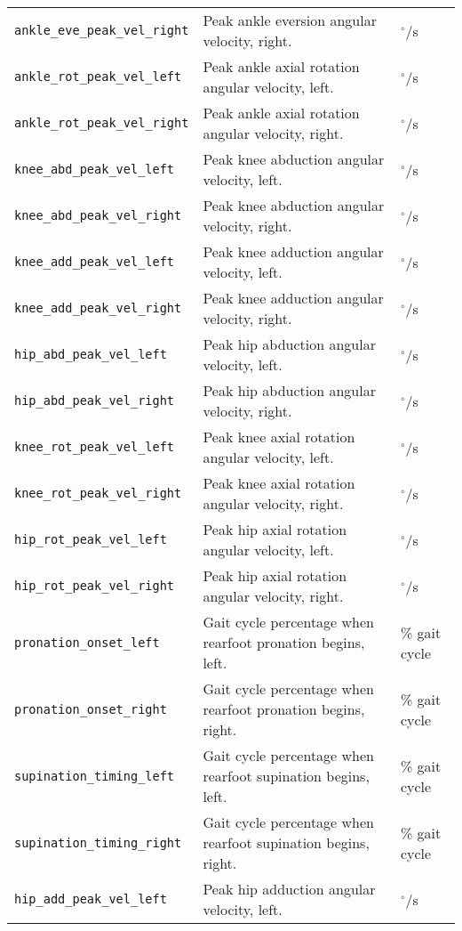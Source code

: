 \begin{longtable}{@{}l p{} l@{}}
    \texttt{ankle\_eve\_peak\_vel\_right} & Peak ankle eversion angular velocity, right. & $^\circ$/s \\
    \texttt{ankle\_rot\_peak\_vel\_left} & Peak ankle axial rotation angular velocity, left. & $^\circ$/s \\
    \texttt{ankle\_rot\_peak\_vel\_right} & Peak ankle axial rotation angular velocity, right. & $^\circ$/s \\
    \texttt{knee\_abd\_peak\_vel\_left} & Peak knee abduction angular velocity, left. & $^\circ$/s \\
    \texttt{knee\_abd\_peak\_vel\_right} & Peak knee abduction angular velocity, right. & $^\circ$/s \\
    \texttt{knee\_add\_peak\_vel\_left} & Peak knee adduction angular velocity, left. & $^\circ$/s \\
    \texttt{knee\_add\_peak\_vel\_right} & Peak knee adduction angular velocity, right. & $^\circ$/s \\
    \texttt{hip\_abd\_peak\_vel\_left} & Peak hip abduction angular velocity, left. & $^\circ$/s \\
    \texttt{hip\_abd\_peak\_vel\_right} & Peak hip abduction angular velocity, right. & $^\circ$/s \\
    \texttt{knee\_rot\_peak\_vel\_left} & Peak knee axial rotation angular velocity, left. & $^\circ$/s \\
    \texttt{knee\_rot\_peak\_vel\_right} & Peak knee axial rotation angular velocity, right. & $^\circ$/s \\
    \texttt{hip\_rot\_peak\_vel\_left} & Peak hip axial rotation angular velocity, left. & $^\circ$/s \\
    \texttt{hip\_rot\_peak\_vel\_right} & Peak hip axial rotation angular velocity, right. & $^\circ$/s \\
    \texttt{pronation\_onset\_left} & Gait cycle percentage when rearfoot pronation begins, left. & \% gait cycle \\
    \texttt{pronation\_onset\_right} & Gait cycle percentage when rearfoot pronation begins, right. & \% gait cycle \\
    \texttt{supination\_timing\_left} & Gait cycle percentage when rearfoot supination begins, left. & \% gait cycle \\
    \texttt{supination\_timing\_right} & Gait cycle percentage when rearfoot supination begins, right. & \% gait cycle \\
    \texttt{hip\_add\_peak\_vel\_left} & Peak hip adduction angular velocity, left. & $^\circ$/s \\

\end{longtable}
